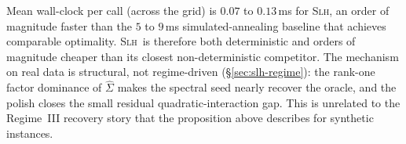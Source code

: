 Mean wall-clock per call (across the grid) is $0.07$ to $0.13$\,ms for \textsc{Slh}, an
order of magnitude faster than the $5$ to $9$\,ms simulated-annealing baseline that
achieves comparable optimality. \textsc{Slh}\ is therefore both deterministic and orders
of magnitude cheaper than its closest non-deterministic competitor. The mechanism on
real data is structural, not regime-driven (\S\ref{sec:slh-regime}): the rank-one factor
dominance of $\hat\Sigma$ makes the spectral seed nearly recover the oracle, and the
polish closes the small residual quadratic-interaction gap. This is unrelated to the
Regime~III recovery story that the proposition above describes for synthetic instances.
